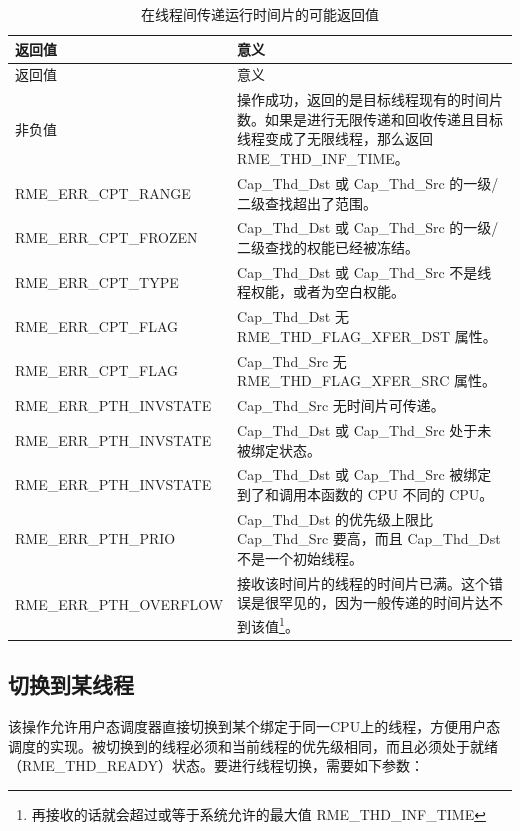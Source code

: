 \begin{xltabular}{\textwidth}{@{}>{\hsize\raggedright\arraybackslash}X>{\hsize\raggedright\arraybackslash}X@{}}
\caption{在线程间传递运行时间片的可能返回值}\label{tab:4-35-transfer-run-time-slice-between-threads-return-values}\\
\toprule
返回值 & 意义\tabularnewline
\endfirsthead
\toprule
返回值 & 意义\tabularnewline
\midrule
\endhead
\bottomrule
\endlastfoot
    非负值 & 操作成功，返回的是目标线程现有的时间片数。如果是进行无限传递和回收传递且目标线程变成了无限线程，那么返回 RME\_THD\_INF\_TIME。\tabularnewline
    RME\_ERR\_CPT\_RANGE & Cap\_Thd\_Dst 或 Cap\_Thd\_Src 的一级/二级查找超出了范围。\tabularnewline
    RME\_ERR\_CPT\_FROZEN & Cap\_Thd\_Dst 或 Cap\_Thd\_Src 的一级/二级查找的权能已经被冻结。\tabularnewline
    RME\_ERR\_CPT\_TYPE & Cap\_Thd\_Dst 或 Cap\_Thd\_Src 不是线程权能，或者为空白权能。\tabularnewline
    RME\_ERR\_CPT\_FLAG & Cap\_Thd\_Dst 无 RME\_THD\_FLAG\_XFER\_DST 属性。\tabularnewline
    RME\_ERR\_CPT\_FLAG & Cap\_Thd\_Src 无 RME\_THD\_FLAG\_XFER\_SRC 属性。\tabularnewline
    RME\_ERR\_PTH\_INVSTATE & Cap\_Thd\_Src 无时间片可传递。\tabularnewline
    RME\_ERR\_PTH\_INVSTATE & Cap\_Thd\_Dst 或 Cap\_Thd\_Src 处于未被绑定状态。\tabularnewline
    RME\_ERR\_PTH\_INVSTATE & Cap\_Thd\_Dst 或 Cap\_Thd\_Src 被绑定到了和调用本函数的 CPU 不同的 CPU。\tabularnewline
    RME\_ERR\_PTH\_PRIO & Cap\_Thd\_Dst 的优先级上限比 Cap\_Thd\_Src 要高，而且 Cap\_Thd\_Dst 不是一个初始线程。\tabularnewline
    RME\_ERR\_PTH\_OVERFLOW & 接收该时间片的线程的时间片已满。这个错误是很罕见的，因为一般传递的时间片达不到该值\footnote{再接收的话就会超过或等于系统允许的最大值 RME\_THD\_INF\_TIME}。\tabularnewline
\end{xltabular}

\subsection{切换到某线程}\label{subsec:4-switch-to-a-thread}
\nopagebreak[4]

该操作允许用户态调度器直接切换到某个绑定于同一CPU上的线程，方便用户态调度的实现。被切换到的线程必须和当前线程的优先级相同，而且必须处于就绪（RME\_THD\_READY）状态。要进行线程切换，需要如下参数：

